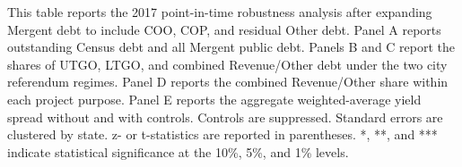 \newpage
\begin{table}[H]\centering
\caption{\textbf{Robustness to including other public debt}}
\label{tab:with_other_robustness}
\parbox{\textwidth}{This table reports the 2017 point-in-time robustness analysis after expanding Mergent debt to include COO, COP, and residual Other debt. Panel A reports outstanding Census debt and all Mergent public debt. Panels B and C report the shares of UTGO, LTGO, and combined Revenue/Other debt under the two city referendum regimes. Panel D reports the combined Revenue/Other share within each project purpose. Panel E reports the aggregate weighted-average yield spread without and with controls. Controls are suppressed. Standard errors are clustered by state. z- or t-statistics are reported in parentheses. *, **, and *** indicate statistical significance at the 10\%, 5\%, and 1\% levels.}
\end{table}

\vspace{10pt}

\vspace{10pt}

\vspace{10pt}

\vspace{10pt}

